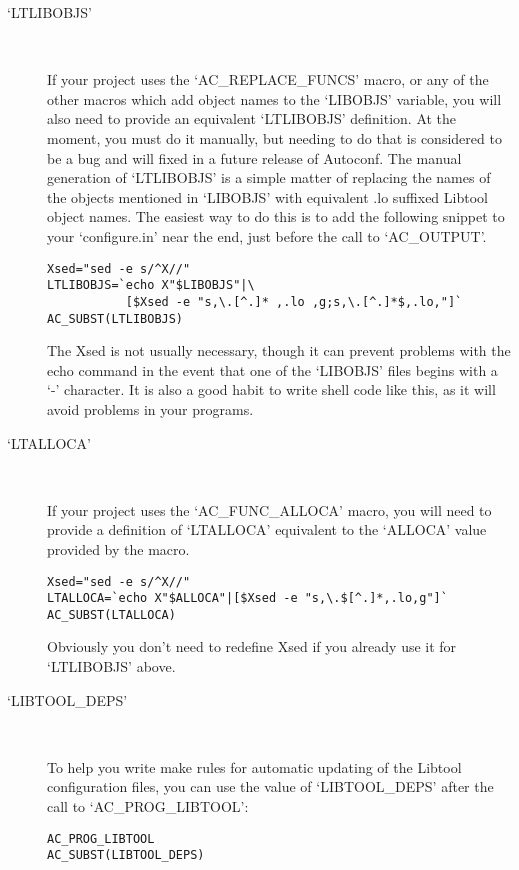\begin{description}
\item[`LTLIBOBJS']
\ 

%
If your project uses the `AC\_{}REPLACE\_{}FUNCS' macro, or any of the 
other macros which add object names to the `LIBOBJS' variable, you will also 
need to provide an equivalent `LTLIBOBJS' definition. At the moment, you 
must do it manually, but needing to do that is considered to be a bug and 
will fixed in a future release of Autoconf. The manual generation 
of `LTLIBOBJS' is a simple matter of replacing the names of the objects 
mentioned in `LIBOBJS' with equivalent .lo suffixed Libtool object names.
The easiest way to do this is to add the following snippet to 
your `configure.in' near the end, just before the call to `AC\_{}OUTPUT'. 
 
\begin{verbatim}
Xsed="sed -e s/^X//"
LTLIBOBJS=`echo X"$LIBOBJS"|\
           [$Xsed -e "s,\.[^.]* ,.lo ,g;s,\.[^.]*$,.lo,"]`
AC_SUBST(LTLIBOBJS)
\end{verbatim}

The Xsed is not usually necessary, though it can prevent problems with 
the echo command in the event that one of the `LIBOBJS' files begins with 
a `-' character. It is also a good habit to write shell code like this, as 
it will avoid problems in your programs. 

\item[`LTALLOCA']
\ 

%
If your project uses the `AC\_{}FUNC\_{}ALLOCA' macro, you will need to provide a definition of `LTALLOCA' equivalent to the `ALLOCA' value provided by the macro. 


 
\begin{verbatim}
Xsed="sed -e s/^X//"
LTALLOCA=`echo X"$ALLOCA"|[$Xsed -e "s,\.$[^.]*,.lo,g"]`
AC_SUBST(LTALLOCA)
\end{verbatim}



Obviously you don't need to redefine Xsed if you already use 
it for `LTLIBOBJS' above. 



\item[`LIBTOOL\_{}DEPS']
\ 

%
To help you write make rules for automatic updating of the Libtool 
configuration files, you can use the value of `LIBTOOL\_{}DEPS' after 
the call to `AC\_{}PROG\_{}LIBTOOL': 

\begin{Verbatim}[frame=single]
AC_PROG_LIBTOOL
AC_SUBST(LIBTOOL_DEPS)
\end{Verbatim}




\end{description}
